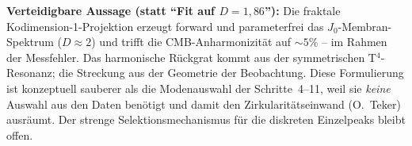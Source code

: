 \textbf{Verteidigbare Aussage (statt ``Fit auf $D=1{,}86$''):} Die
fraktale Kodimension-1-Projektion erzeugt forward und parameterfrei das
$J_0$-Membran-Spektrum ($D\approx2$) und trifft die CMB-Anharmonizität auf
$\sim5\%$ -- im Rahmen der Messfehler. Das harmonische Rückgrat kommt aus
der symmetrischen T$^4$-Resonanz; die Streckung aus der Geometrie der
Beobachtung. Diese Formulierung ist konzeptuell sauberer als die
Modenauswahl der Schritte~4--11, weil sie \emph{keine} Auswahl aus den Daten benötigt und
damit den Zirkularitätseinwand (O.~Teker) ausräumt. Der strenge
Selektionsmechanismus für die diskreten Einzelpeaks bleibt offen.
